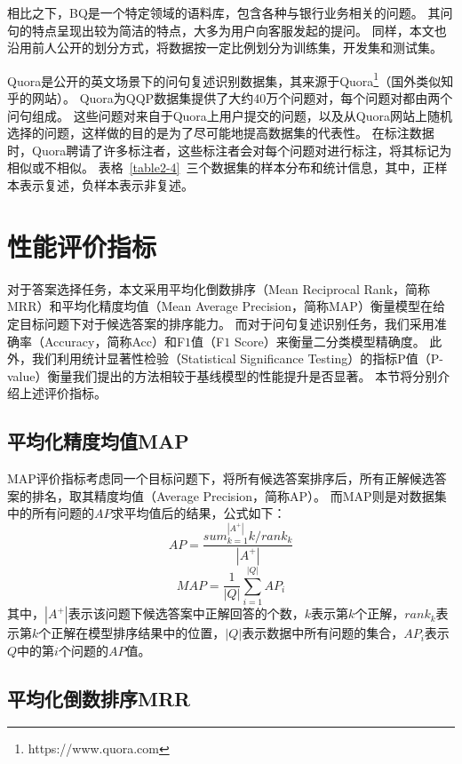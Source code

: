 相比之下，BQ是一个特定领域的语料库，包含各种与银行业务相关的问题。
其问句的特点呈现出较为简洁的特点，大多为用户向客服发起的提问。
同样，本文也沿用前人公开的划分方式，将数据按一定比例划分为训练集，开发集和测试集。

Quora是公开的英文场景下的问句复述识别数据集，其来源于Quora\footnote{https://www.quora.com}（国外类似知乎的网站）。
Quora为QQP数据集提供了大约40万个问题对，每个问题对都由两个问句组成。
这些问题对来自于Quora上用户提交的问题，以及从Quora网站上随机选择的问题，这样做的目的是为了尽可能地提高数据集的代表性。
在标注数据时，Quora聘请了许多标注者，这些标注者会对每个问题对进行标注，将其标记为相似或不相似。
表格~\ref{table2-4}~三个数据集的样本分布和统计信息，其中，正样本表示复述，负样本表示非复述。



\section{性能评价指标}
\label{2.3 性能评价指标}

对于答案选择任务，本文采用平均化倒数排序（Mean Reciprocal Rank，简称MRR）和平均化精度均值（Mean Average Precision，简称MAP）衡量模型在给定目标问题下对于候选答案的排序能力。
而对于问句复述识别任务，我们采用准确率（Accuracy，简称Acc）和F$1$值（F$1$ Score）来衡量二分类模型精确度。
此外，我们利用统计显著性检验（Statistical Significance Testing）\cite{dror2018hitchhiker}的指标P值（P-value）衡量我们提出的方法相较于基线模型的性能提升是否显著。
本节将分别介绍上述评价指标。

\subsection{平均化精度均值MAP}

MAP评价指标考虑同一个目标问题下，将所有候选答案排序后，所有正解候选答案的排名，取其精度均值（Average Precision，简称AP）。
而MAP则是对数据集中的所有问题的$AP$求平均值后的结果，公式如下：
\begin{equation}
    AP = \frac{sum_{k=1}^{|A^+|}k/rank_k}{|A^+|}
\end{equation}
\begin{equation}
    MAP = \frac{1}{|Q|} \sum_{i=1}^{|Q|}AP_i
\end{equation}
其中，$|A^+|$表示该问题下候选答案中正解回答的个数，$k$表示第$k$个正解，$rank_k$表示第$k$个正解在模型排序结果中的位置，$|Q|$表示数据中所有问题的集合，$AP_i$表示$Q$中的第$i$个问题的$AP$值。


\subsection{平均化倒数排序MRR}

